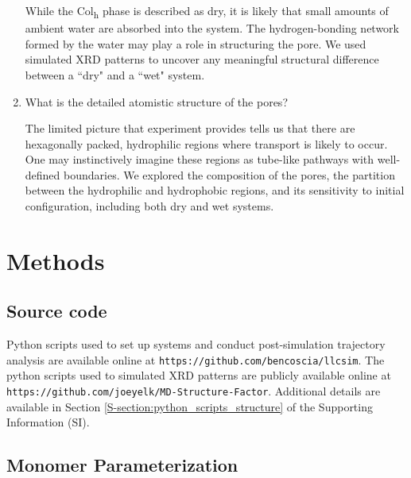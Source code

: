 \begin{enumerate}
	While the Col\textsubscript{h} phase is described as dry, it is likely
	that small amounts of ambient water are absorbed into the system. The
	hydrogen-bonding network formed by the water may play a role in structuring the
	pore. We used simulated XRD patterns to uncover any meaningful structural
	difference between a ``dry" and a ``wet" system.

	\item What is the detailed atomistic structure of the pores?\label{point:composition}

	The limited picture that experiment provides tells us that there are hexagonally packed, 
	hydrophilic regions where transport is likely to occur. One may instinctively imagine these 
	regions as tube-like pathways with well-defined boundaries. We explored the composition
	of the pores, the partition between the hydrophilic and hydrophobic regions, and its 
	sensitivity to initial configuration, including both dry and wet systems. 

  \end{enumerate}

  \section{Methods}
 
  \subsection{Source code}

  Python scripts used to set up systems and conduct post-simulation trajectory analysis are
  available online at \texttt{https://github.com/bencoscia/llcsim}. The python scripts used
  to simulated XRD patterns are publicly available online at \\
  \texttt{https://github.com/joeyelk/MD-Structure-Factor}. Additional details are available in 
  Section \ref{S-section:python_scripts_structure} of the Supporting Information (SI).
  
  \subsection{Monomer Parameterization}\label{method:parameterization}

